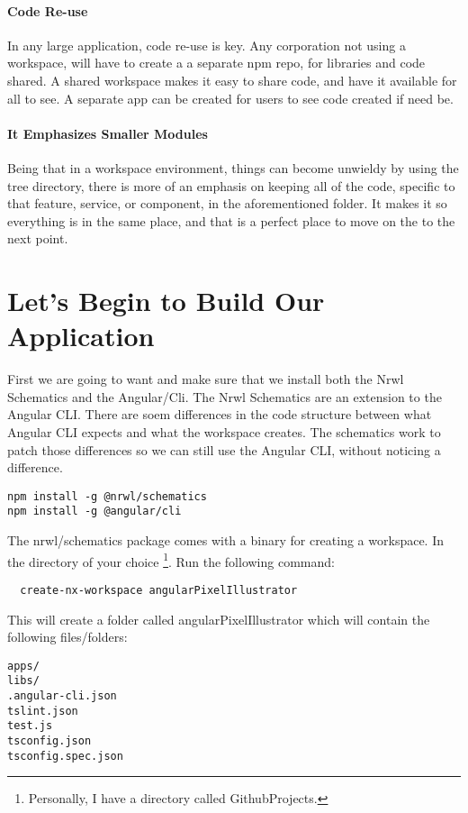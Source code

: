 \paragraph{Code Re-use}
In any large application, code re-use is key. Any corporation not using a
workspace, will have to create a a separate npm repo, for libraries and code
shared. A shared workspace makes it easy to share code, and have it available
for all to see. A separate app can be created for users to see code created if
need be.

\paragraph{It Emphasizes Smaller Modules}
Being that in a workspace environment, things can become unwieldy by using the
tree directory, there is more of an emphasis on keeping all of the code,
specific to that feature, service, or component, in the aforementioned folder.
It makes it so everything is in the same place, and that is a perfect place to
move on the to the next point.

\section{Let's Begin to Build Our Application}

First we are going to want and make sure that we install both the Nrwl Schematics
and the Angular/Cli. The Nrwl Schematics are an extension to the Angular CLI.
There are soem differences in the code structure between what Angular CLI expects
and what the workspace creates. The schematics work to patch those differences
so we can still use the Angular CLI, without noticing a difference.

\begin{verbatim}
npm install -g @nrwl/schematics
npm install -g @angular/cli
\end{verbatim}

The nrwl/schematics package comes with a binary for creating a workspace. In the
directory of your choice \footnote{Personally, I have a directory called
GithubProjects.}. Run the following command:
\begin{verbatim}
  create-nx-workspace angularPixelIllustrator
\end{verbatim}

This will create a folder called angularPixelIllustrator which will contain the
following files/folders:
\begin{verbatim}
apps/
libs/
.angular-cli.json
tslint.json
test.js
tsconfig.json
tsconfig.spec.json
\end{verbatim}

